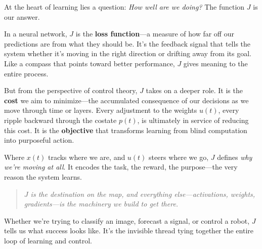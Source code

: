 At the heart of learning lies a question: \emph{How well are we doing?} The function \(J\) is our answer.

In a neural network, \(J\) is the \textbf{loss function}—a measure of how far off our predictions are from what they should be. It's the feedback signal that tells the system whether it's moving in the right direction or drifting away from its goal. Like a compass that points toward better performance, \(J\) gives meaning to the entire process.

But from the perspective of control theory, \(J\) takes on a deeper role. It is the \textbf{cost} we aim to minimize—the accumulated consequence of our decisions as we move through time or layers. Every adjustment to the weights \(u(t)\), every ripple backward through the costate \(p(t)\), is ultimately in service of reducing this cost. It is the \textbf{objective} that transforms learning from blind computation into purposeful action.

Where \(x(t)\) tracks where we are, and \(u(t)\) steers where we go, \(J\) defines \emph{why we’re moving at all}. It encodes the task, the reward, the purpose—the very reason the system learns.

\begin{quote}
\emph{\(J\) is the destination on the map, and everything else—activations, weights, gradients—is the machinery we build to get there.}
\end{quote}

Whether we're trying to classify an image, forecast a signal, or control a robot, \(J\) tells us what success looks like. It’s the invisible thread tying together the entire loop of learning and control.



